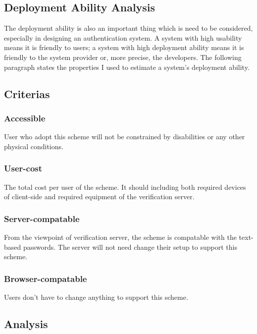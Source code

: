 \begin{CJK}{Bg5}{bsmi}
\section{Deployment Ability Analysis}

The deployment ability is also an important thing which is need to be considered, especially in designing an authentication system. A system with high usability means it is friendly to users; a system with high deployment ability means it is friendly to the system provider or, more precise, the developers. The following paragraph states the properties I used to estimate a system's deployment ability.

\subsection{Criterias}

\subsubsection{Accessible}

User who adopt this scheme will not be constrained by disabilities or any other physical conditions.

\subsubsection{User-cost}

The total cost per user of the scheme. It should including both required devices of client-side and required equipment of the verification server.

\subsubsection{Server-compatable}

From the viewpoint of verification server, the scheme is compatable with the text-based passwords. The server will not need change their setup to support this scheme. 

\subsubsection{Browser-compatable}

Users don't have to change anything to support this scheme. 

\subsection{Analysis}


\end{CJK}
